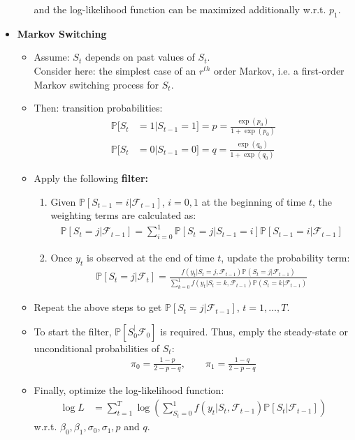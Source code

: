\documentclass[a4paper,landscape,8pt,fleqn]{scrartcl}
\renewcommand{\emph}[1]{\textbf{#1}}
\begin{document}
\begin{multicols*}{3}
\begin{itemize}
\begin{itemize}
and the log-likelihood function can be maximized additionally w.r.t. $p_1$.
\end{itemize}
\item \emph{Markov Switching}
\begin{itemize}
\item Assume: $S_t$ depends on past values of $S_t$. \\
Consider here: the simplest case of an $r^{th}$ order Markov, i.e. a first-order Markov switching process for $S_t$.
\item Then: transition probabilities:
\begin{align*}
\mathbb{P}[S_t &= 1 | S_{t-1} = 1] = p = \frac{\exp(p_0)}{1 + \exp(p_0)} \\
\mathbb{P}[S_t &= 0 | S_{t-1} = 0] = q = \frac{\exp(q_0)}{1 + \exp(q_0)}
\end{align*}
\item Apply the following \emph{filter:}
\begin{enumerate}
\item Given $\mathbb{P}[S_{t-1} = i | \mathcal{F}_{t-1}]$, $i = 0,1$ at the beginning of time $t$, the weighting terms are calculated as:
\begin{align*}
\mathbb{P}[S_t = j | \mathcal{F}_{t-1}] = \sum_{i=0}^1 \mathbb{P}[S_t = j | S_{t-1} = i] \mathbb{P}[S_{t-1} = i | \mathcal{F}_{t-1}]
\end{align*}
\item Once $y_t$ is observed at the end of time $t$, update the probability term:
\begin{align*}
\mathbb{P}[S_t = j | \mathcal{F}_t] = \frac{f(y_t | S_t = j, \mathcal{F}_{t-1}) \mathbb{P}(S_t = j | \mathcal{F}_{t-1})}{\sum_{k=0}^1 f(y_t | S_t = k, \mathcal{F}_{t-1}) \mathbb{P}(S_t = k | \mathcal{F}_{t-1})}
\end{align*}
\end{enumerate}
\item Repeat the above steps to get $\mathbb{P}[S_t = j | \mathcal{F}_{t-1}]$, $t=1,\ldots,T$.
\item To start the filter, $\mathbb{P}[S_0^ | \mathcal{F}_0]$ is required. Thus, emply the steady-state or unconditional probabilities of $S_t$:
\begin{align*}
\pi_0 = \frac{1-p}{2-p-q}, \qquad \pi_1 = \frac{1-q}{2-p-q}
\end{align*}
\item Finally, optimize the log-likelihood function:
\begin{align*}
\log L &= \sum_{t=1}^T \log \left( \sum_{S_t=0}^1 f(y_t | S_t, \mathcal{F}_{t-1}) \mathbb{P}[S_t | \mathcal{F}_{t-1}] \right)
\end{align*}
w.r.t. $\beta_0, \beta_1, \sigma_0, \sigma_1, p$ and $q$.
\end{itemize}
\end{itemize}


\end{multicols*}
\end{document}
